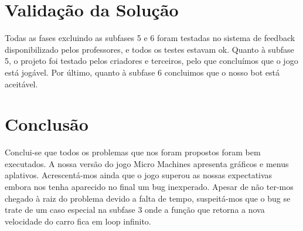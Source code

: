 \documentclass[a4paper]{report} %
\begin{document}
\chapter{Validação da Solução}

Todas as fases excluindo as subfases 5 e 6 foram testadas no sistema de feedback disponibilizado pelos professores, e todos os testes estavam ok.
Quanto à subfase 5, o projeto foi testado pelos criadores e terceiros, pelo que concluímos que o jogo está jogável.
Por último, quanto à subfase 6 concluimos que o nosso bot está aceitável.


\chapter{Conclusão}

Conclui-se que todos os problemas que nos foram propostos foram bem executados. A nossa versão do jogo Micro Machines apresenta gráficos e menus aplativos.
Acrescentá-mos ainda que o jogo superou as nossas expectativas embora nos tenha aparecido no final um bug inexperado. Apesar de não ter-mos chegado à raiz do problema devido a falta de tempo, suspeitá-mos que o bug se trate de um caso especial na subfase 3 onde a função que retorna a nova velocidade do carro fica em loop infinito.
\end{document}
